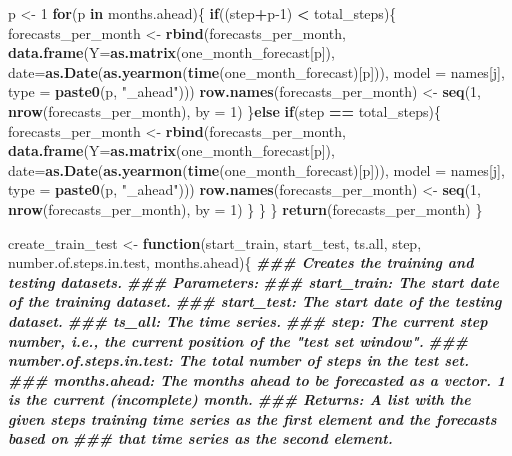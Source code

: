 \documentclass[
]{article}
\newenvironment{Shaded}{\begin{snugshade}}{\end{snugshade}}
\newcommand{\AttributeTok}[1]{\textcolor[rgb]{0.13,0.29,0.53}{#1}}
\newcommand{\ControlFlowTok}[1]{\textcolor[rgb]{0.13,0.29,0.53}{\textbf{#1}}}
\newcommand{\DecValTok}[1]{\textcolor[rgb]{0.00,0.00,0.81}{#1}}
\newcommand{\DocumentationTok}[1]{\textcolor[rgb]{0.56,0.35,0.01}{\textbf{\textit{#1}}}}
\newcommand{\FunctionTok}[1]{\textcolor[rgb]{0.13,0.29,0.53}{\textbf{#1}}}
\newcommand{\NormalTok}[1]{#1}
\newcommand{\OtherTok}[1]{\textcolor[rgb]{0.56,0.35,0.01}{#1}}
\newcommand{\SpecialCharTok}[1]{\textcolor[rgb]{0.81,0.36,0.00}{\textbf{#1}}}
\newcommand{\StringTok}[1]{\textcolor[rgb]{0.31,0.60,0.02}{#1}}
\begin{document}
\begin{Shaded}
\begin{Highlighting}[]
\NormalTok{    p }\OtherTok{\textless{}{-}} \DecValTok{1}
    \ControlFlowTok{for}\NormalTok{(p }\ControlFlowTok{in}\NormalTok{ months.ahead)\{}
      \ControlFlowTok{if}\NormalTok{((step}\SpecialCharTok{+}\NormalTok{p}\DecValTok{{-}1}\NormalTok{) }\SpecialCharTok{\textless{}}\NormalTok{ total\_steps)\{}
\NormalTok{        forecasts\_per\_month }\OtherTok{\textless{}{-}} \FunctionTok{rbind}\NormalTok{(forecasts\_per\_month, }\FunctionTok{data.frame}\NormalTok{(}\AttributeTok{Y=}\FunctionTok{as.matrix}\NormalTok{(one\_month\_forecast[p]), }\AttributeTok{date=}\FunctionTok{as.Date}\NormalTok{(}\FunctionTok{as.yearmon}\NormalTok{(}\FunctionTok{time}\NormalTok{(one\_month\_forecast)[p])), }\AttributeTok{model =}\NormalTok{ names[j], }\AttributeTok{type =} \FunctionTok{paste0}\NormalTok{(p, }\StringTok{"\_ahead"}\NormalTok{)))}
        \FunctionTok{row.names}\NormalTok{(forecasts\_per\_month) }\OtherTok{\textless{}{-}} \FunctionTok{seq}\NormalTok{(}\DecValTok{1}\NormalTok{, }\FunctionTok{nrow}\NormalTok{(forecasts\_per\_month), }\AttributeTok{by =} \DecValTok{1}\NormalTok{)}
\NormalTok{      \}}\ControlFlowTok{else} \ControlFlowTok{if}\NormalTok{(step }\SpecialCharTok{==}\NormalTok{ total\_steps)\{}
\NormalTok{        forecasts\_per\_month }\OtherTok{\textless{}{-}} \FunctionTok{rbind}\NormalTok{(forecasts\_per\_month, }\FunctionTok{data.frame}\NormalTok{(}\AttributeTok{Y=}\FunctionTok{as.matrix}\NormalTok{(one\_month\_forecast[p]), }\AttributeTok{date=}\FunctionTok{as.Date}\NormalTok{(}\FunctionTok{as.yearmon}\NormalTok{(}\FunctionTok{time}\NormalTok{(one\_month\_forecast)[p])), }\AttributeTok{model =}\NormalTok{ names[j],}
                                                \AttributeTok{type =} \FunctionTok{paste0}\NormalTok{(p, }\StringTok{"\_ahead"}\NormalTok{)))}
        \FunctionTok{row.names}\NormalTok{(forecasts\_per\_month) }\OtherTok{\textless{}{-}} \FunctionTok{seq}\NormalTok{(}\DecValTok{1}\NormalTok{, }\FunctionTok{nrow}\NormalTok{(forecasts\_per\_month), }\AttributeTok{by =} \DecValTok{1}\NormalTok{)}
\NormalTok{      \}}
\NormalTok{    \}}
\NormalTok{  \}}
  \FunctionTok{return}\NormalTok{(forecasts\_per\_month)}
\NormalTok{\}}

\NormalTok{create\_train\_test }\OtherTok{\textless{}{-}} \ControlFlowTok{function}\NormalTok{(start\_train, start\_test, ts.all, step, number.of.steps.in.test, months.ahead)\{}
\DocumentationTok{\#\#\# Creates the training and testing datasets.}
\DocumentationTok{\#\#\# Parameters:}
\DocumentationTok{\#\#\# start\_train: The start date of the training dataset.}
\DocumentationTok{\#\#\# start\_test: The start date of the testing dataset.}
\DocumentationTok{\#\#\# ts\_all: The time series.}
\DocumentationTok{\#\#\# step: The current step number, i.e., the current position of the "test set window".}
\DocumentationTok{\#\#\# number.of.steps.in.test: The total number of steps in the test set.}
\DocumentationTok{\#\#\# months.ahead: The months ahead to be forecasted as a vector. 1 is the current (incomplete) month.}
\DocumentationTok{\#\#\# Returns: A list with the given step\textquotesingle{}s training time series as the first element and the forecasts based on}
\DocumentationTok{\#\#\# that time series as the second element.}


\end{Highlighting}
\end{Shaded}
\end{document}
